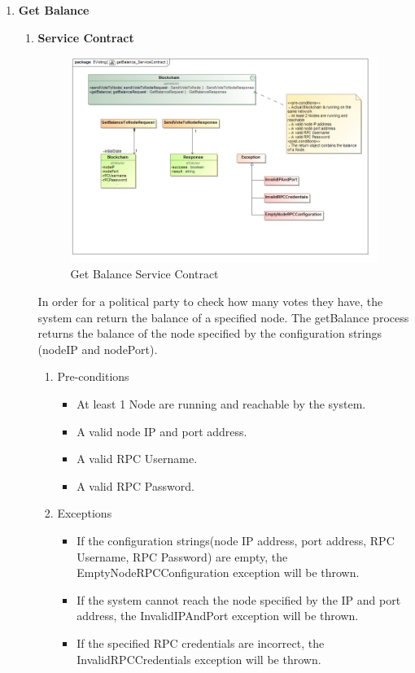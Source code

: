 \begin{enumerate}
\begin{enumerate}
				\newline
		\end{enumerate}
	\newpage
	\item \textbf{Get Balance}
		\begin{enumerate}
			\item \textbf{Service Contract}
			\begin{figure}[H]
				\centering
				\includegraphics[width=0.75\linewidth]{../Images/Blockchain/ServiceContracts/getBalance_ServiceContract.jpg}
				\caption{Get Balance Service Contract}
			\end{figure}
			 
			In order for a political party to check how many votes they have, the system can return the balance of a specified node. The getBalance process returns the balance of the node specified by the configuration strings (nodeIP and nodePort).
			\newline
			
			\begin{enumerate}
				\item Pre-conditions
				\begin{itemize}
						\item At least 1 Node are running and reachable by the system.
						\item A valid node IP and port address.
						\item A valid RPC Username.
						\item A valid RPC Password.
				\end{itemize}
				
				\item Exceptions
				\begin{itemize}
						\item If the configuration strings(node IP address, port address, RPC Username, RPC Password) are empty, the EmptyNodeRPCConfiguration exception will be thrown.
						\item If the system cannot reach the node specified by the IP and port address, the InvalidIPAndPort exception will be thrown.
						\item If the specified RPC credentials are incorrect, the InvalidRPCCredentials exception will be thrown.
				\end{itemize}
				

\end{enumerate}
\end{enumerate}
\end{enumerate}
